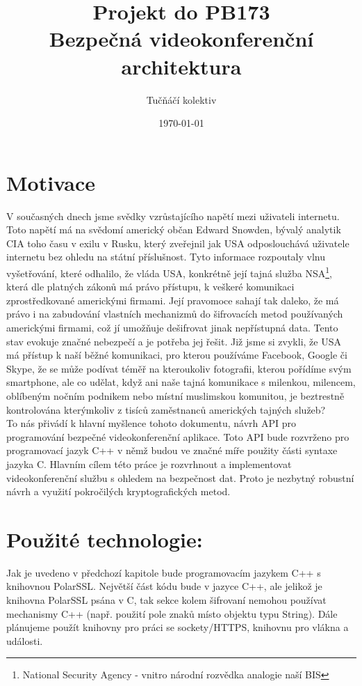 \documentclass[a4paper, 12pt, titlepage]{article}
\title{Projekt do PB173 \\ Bezpečná videokonferenční architektura}
\author{Tučňáčí kolektiv}
\date{\today}
\begin{document}
\maketitle
\newpage
\tableofcontents
\newpage

\section{Motivace}
V současných dnech jsme svědky vzrůstajícího napětí mezi uživateli internetu. Toto
napětí má na svědomí americký občan Edward Snowden, bývalý analytik CIA toho času
v exilu v Rusku, který zveřejnil jak USA odposlouchává uživatele internetu bez ohledu
na státní příslušnost. Tyto informace rozpoutaly vlnu vyšetřování, které odhalilo,
že vláda USA, konkrétně její tajná služba NSA\footnote{National Security Agency - 
vnitro národní rozvědka analogie naší BIS}, která dle platných zákonů má právo přístupu,
k veškeré komunikaci zprostředkované americkými firmami. Její pravomoce sahají tak
daleko, že má právo i na zabudování vlastních mechanizmů do šifrovacích metod 
používaných americkými firmami, což jí umožňuje dešifrovat jinak nepřístupná data.
Tento stav evokuje značné nebezpečí a je potřeba jej řešit. Již jsme si zvykli,
že USA má přístup k naší běžné komunikaci, pro kterou používáme Facebook, Google
či Skype, že se může podívat téměř na kteroukoliv fotografii, kterou pořídíme svým
smartphone, ale co udělat, když ani naše tajná komunikace s milenkou, milencem,
oblíbeným nočním podnikem nebo místní muslimskou komunitou, je beztrestně kontrolována
kterýmkoliv z tisíců zaměstnanců amerických tajných služeb?
\\
To nás přivádí k hlavní myšlence tohoto dokumentu, návrh API pro programování
bezpečné videokonferenční aplikace. Toto API bude rozvrženo pro programovací jazyk
C++ v němž budou ve značné míře použity části syntaxe jazyka C. Hlavním cílem této práce je rozvrhnout
a implementovat videokonferenční službu s ohledem na bezpečnost dat. Proto je nezbytný
robustní návrh a využití pokročilých kryptografických metod.

\section{Použité technologie:}
Jak je uvedeno v předchozí kapitole bude programovacím jazykem C++ s knihovnou PolarSSL.
Největší část kódu bude v jazyce C++, ale jelikož je knihovna
PolarSSL psána v C, tak sekce kolem šifrovaní nemohou používat mechanismy C++ 
(např. použití pole znaků místo objektu typu String).
Dále plánujeme použít knihovny pro práci se sockety/HTTPS, knihovnu pro vlákna a 
události.
\end{document}
